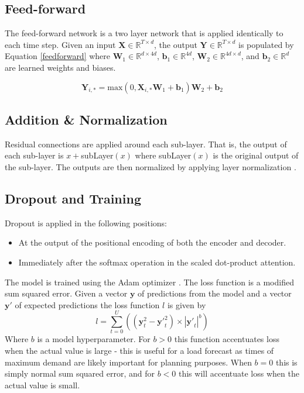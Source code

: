 \documentclass[conference]{IEEEtran}
\begin{document}
\subsection{Feed-forward}
The feed-forward network is a two layer network that is applied identically to each time step.
Given an input $\boldsymbol{X} \in \mathbb{R}^{T \times d}$, the output $\boldsymbol{Y} \in \mathbb{R}^{T \times d}$ is populated by Equation \ref{feedforward} where $\boldsymbol{W}_1 \in \mathbb{R}^{d \times 4d}$, $\boldsymbol{b}_1 \in \mathbb{R}^{4d}$, $\boldsymbol{W}_2 \in \mathbb{R}^{4d \times d}$, and $\boldsymbol{b}_2 \in \mathbb{R}^{d}$ are learned weights and biases.

\begin{equation} \label{feedforward}
\boldsymbol{Y}_{i,*} = \text{max}(0, \boldsymbol{X}_{i,*}  \boldsymbol{W}_1 + \boldsymbol{b}_1)  \boldsymbol{W}_2 + \boldsymbol{b}_2
\end{equation}

\subsection{Addition \& Normalization}
Residual connections \cite{He2015} are applied around each sub-layer.
That is, the output of each sub-layer is $x + $subLayer$(x)$ where subLayer$(x)$ is the original output of the sub-layer.
The outputs are then normalized by applying layer normalization \cite{Ba2016}.

\subsection{Dropout and Training}
Dropout is applied in the following positions:
\begin{itemize}
	\item At the output of the positional encoding of both the encoder and decoder.
	\item Immediately after the softmax operation in the scaled dot-product attention.
\end{itemize}
The model is trained using the Adam optimizer \cite{Kingma2014}.
The loss function is a modified sum squared error.
Given a vector $\boldsymbol{y}$ of predictions from the model and a vector $\boldsymbol{y'}$ of expected predictions the loss function $l$ is given by 
\begin{equation}
l = \sum_{t=0}^{U}((\boldsymbol{y}_t^2 - \boldsymbol{y'}_t^2) \times |\boldsymbol{y'}_t|^b)
\end{equation}
Where $b$ is a model hyperparameter.
For $b>0$ this function accentuates loss when the actual value is large - this is useful for a load forecast as times of maximum demand are likely important for planning purposes.
When $b=0$ this is simply normal sum squared error, and for $b<0$ this will accentuate loss when the actual value is small.
\end{document}
